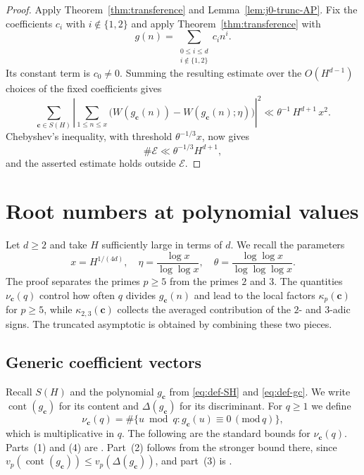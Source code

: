 \documentclass[12pt,reqno]{amsart}
\numberwithin{equation}{section}
\theoremstyle{definition}
\renewcommand{\le}{\leqslant}
\renewcommand{\ge}{\geqslant}
\newcommand{\cc}{\mathbf{c}}
\DeclareMathOperator{\cont}{cont}
\newcommand{\rw}{W}
\renewcommand{\pmod}[1]{\,(\mathrm{mod}\,#1)}
\begin{document}
\begin{proof}
Apply Theorem~\ref{thm:transference} and Lemma~\ref{lem:j0-trunc-AP}.
Fix the coefficients $c_i$ with $i\notin\{1,2\}$ and apply Theorem~\ref{thm:transference} with
\[
g(n)=\sum_{\substack{0\le i\le d\\i\notin\{1,2\}}}c_i n^i.
\]
Its constant term is $c_0\ne0$.
Summing the resulting estimate over the $O(H^{d-1})$ choices of the fixed coefficients gives
\[
\sum_{\cc\in S(H)}
\left|\sum_{1\le n\le x}
\bigl(\rw(g_\cc(n))-\rw(g_\cc(n);\eta)\bigr)\right|^{2}
\ll \theta^{-1}\,H^{d+1}\,x^{2}.
\]
Chebyshev's inequality, with threshold $\theta^{-1/3}x$, now gives
\[
\#\mathcal E
\ll \theta^{-1/3}H^{d+1},
\]
and the asserted estimate holds outside $\mathcal E$.
\end{proof}

\section{Root numbers at polynomial values}\label{sec:poly-sum}

Let $d\ge 2$ and take $H$ sufficiently large in terms of $d$.
We recall the parameters
\[
x=H^{1/(4d)},\quad 
\eta=\frac{\log x}{\log\log x},\quad
\theta = \frac{\log \log x}{\log \log \log x}.
\]
The proof separates the primes $p\ge 5$ from the primes $2$ and $3$.
The quantities $\nu_\cc(q)$ control how often $q$ divides $g_\cc(n)$ and lead to the local factors $\kappa_p(\cc)$ for $p\ge 5$, while $\kappa_{2,3}(\cc)$ collects the averaged contribution of the $2$- and $3$-adic signs.
The truncated asymptotic is obtained by combining these two pieces.

\subsection{Generic coefficient vectors}

Recall $S(H)$ and the polynomial $g_\cc$ from \eqref{eq:def-SH} and \eqref{eq:def-gc}.
We write $\cont(g_\cc)$ for its content and $\Delta(g_\cc)$ for its discriminant.
For $q\ge 1$ we define
\begin{equation}\label{eq:def-nu}
\nu_{\cc}(q)=\#\{u\bmod q:g_\cc(u)\equiv0\pmod q\},
\end{equation}
which is multiplicative in $q$.
The following are the standard bounds for $\nu_\cc(q)$.
Parts~(1) and (4) are \cite[Lemma~6.1]{BST}.
Part~(2) follows from the stronger bound there, since
$v_p(\cont(g_\cc))\le v_p(\Delta(g_\cc))$, and part~(3) is \cite[Eq.~(43)]{Ste}.
\end{document}
